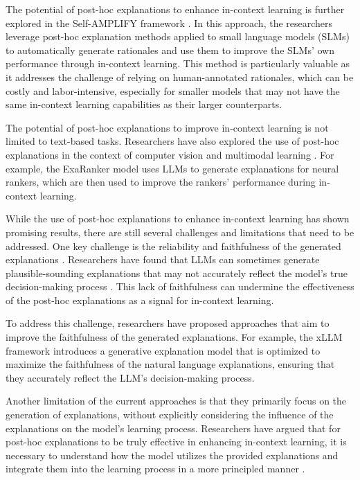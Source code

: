 \documentclass[11pt]{article}
\begin{document}
The potential of post-hoc explanations to enhance in-context learning is further explored in the Self-AMPLIFY framework \cite{ref204}. In this approach, the researchers leverage post-hoc explanation methods applied to small language models (SLMs) to automatically generate rationales and use them to improve the SLMs' own performance through in-context learning. This method is particularly valuable as it addresses the challenge of relying on human-annotated rationales, which can be costly and labor-intensive, especially for smaller models that may not have the same in-context learning capabilities as their larger counterparts.

The potential of post-hoc explanations to improve in-context learning is not limited to text-based tasks. Researchers have also explored the use of post-hoc explanations in the context of computer vision and multimodal learning \cite{ref205}. For example, the ExaRanker model \cite{ref206} uses LLMs to generate explanations for neural rankers, which are then used to improve the rankers' performance during in-context learning.

While the use of post-hoc explanations to enhance in-context learning has shown promising results, there are still several challenges and limitations that need to be addressed. One key challenge is the reliability and faithfulness of the generated explanations \cite{ref207,ref208}. Researchers have found that LLMs can sometimes generate plausible-sounding explanations that may not accurately reflect the model's true decision-making process \cite{ref203}. This lack of faithfulness can undermine the effectiveness of the post-hoc explanations as a signal for in-context learning.

To address this challenge, researchers have proposed approaches that aim to improve the faithfulness of the generated explanations. For example, the xLLM framework \cite{ref209} introduces a generative explanation model that is optimized to maximize the faithfulness of the natural language explanations, ensuring that they accurately reflect the LLM's decision-making process.

Another limitation of the current approaches is that they primarily focus on the generation of explanations, without explicitly considering the influence of the explanations on the model's learning process. Researchers have argued that for post-hoc explanations to be truly effective in enhancing in-context learning, it is necessary to understand how the model utilizes the provided explanations and integrate them into the learning process in a more principled manner \cite{ref210}.
\end{document}
